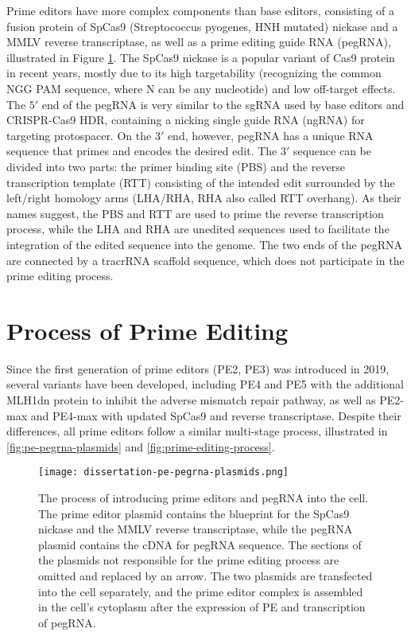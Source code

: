 Prime editors have more complex components than base editors, consisting of a fusion protein of  SpCas9 (Streptococcus pyogenes, HNH mutated) nickase and a MMLV reverse transcriptase, as well as a prime editing guide RNA (pegRNA), illustrated in Figure \ref{fig:pe-pegrna-plasmids}. The SpCas9  nickase is a popular variant of Cas9 protein in recent years, mostly due to its high targetability (recognizing the common NGG PAM sequence, where N can be any nucleotide) and low off-target effects\cite{waltonUnconstrainedGenomeTargeting2020}. The $5'$ end of the pegRNA is very similar to the sgRNA used by base editors and CRISPR-Cas9 HDR, containing a nicking single guide RNA (ngRNA) for targeting protospacer. On the $3'$ end, however, pegRNA has a unique RNA sequence that primes and encodes the desired edit. The $3'$ sequence can be divided into two parts: the primer binding site (PBS) and the reverse transcription template (RTT) consisting of the intended edit surrounded by the left/right homology arms (LHA/RHA, RHA also called RTT overhang). As their names suggest, the PBS and RTT are used to prime the reverse transcription process, while the LHA and RHA are unedited sequences used to facilitate the integration of the edited sequence into the genome. The two ends of the pegRNA are connected by a tracrRNA scaffold sequence, which does not participate in the prime editing process. 

\section{Process of Prime Editing}

\label{sec:prime-editing-process}

Since the first generation of prime editors (PE2, PE3) was introduced in 2019, several variants have been developed, including PE4 and PE5 with the additional MLH1dn protein to inhibit the adverse mismatch repair pathway, as well as PE2-max and PE4-max with updated SpCas9 and reverse transcriptase\cite{liuPrimeEditingPrecise2023}. Despite their differences, all prime editors follow a similar multi-stage process, illustrated in \autoref{fig:pe-pegrna-plasmids} and \autoref{fig:prime-editing-process}. 

\begin{figure}
    \centering
    \texttt{[image: dissertation-pe-pegrna-plasmids.png]}
    \caption[Plasmids for Prime Editing]{The process of introducing prime editors and pegRNA into the cell. The prime editor plasmid contains the blueprint for the SpCas9 nickase and the MMLV reverse transcriptase, while the pegRNA plasmid contains the cDNA for pegRNA sequence. The sections of the plasmids not responsible for the prime editing process are omitted and replaced by an arrow. The two plasmids are transfected into the cell separately, and the prime editor complex is assembled in the cell's cytoplasm after the expression of PE and transcription of pegRNA.}
    \label{fig:pe-pegrna-plasmids}
\end{figure}

